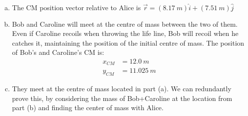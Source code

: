 \begin{finalanswer}
\begin{enumerate}[(a)]
\item The CM position vector relative to Alice is $\vec r = (\SI{8.17}{m})\hat{i}+(\SI{7.51}{m})\hat{j}$
\item Bob and Caroline will meet at the centre of mass between the two of them. Even if Caroline recoils when throwing the life line, Bob will recoil when he catches it, maintaining the position of the initial centre of mass. The position of Bob's and Caroline's CM is:
\begin{align*}
x_{CM}&=\SI{12.0}{m}\\
y_{CM}&=\SI{11.025}{m}
\end{align*}
\item They meet at the centre of mass located in part (a). We can redundantly prove this, by considering the mass of Bob+Caroline at the location from part (b) and finding the center of mass with Alice.
\end{enumerate}
\end{finalanswer}
